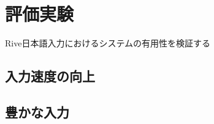 \chapter{評価実験}
\label{chap:application}

Rive日本語入力におけるシステムの有用性を検証する

\section{入力速度の向上}
\section{豊かな入力}
